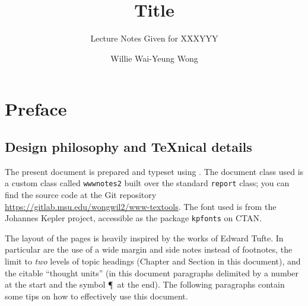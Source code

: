 \documentclass[noocg]{wwwnotes2}
\title{Title}
\subtitle{Lecture Notes Given for XXXYYY}
\author{Willie Wai-Yeung Wong}
\begin{document}
\maketitle


\chapter*{Preface}

\section{Design philosophy and \TeX{}nical details}

The present document is prepared and typeset using \LaTeXe. The document class used is a custom class called \texttt{wwwnotes2} built over the standard \texttt{report} class; you can find the source code at the Git repository \url{https://gitlab.msu.edu/wongwil2/www-textools}. The font used is from the Johannes Kepler project, accessible as the package \texttt{kpfonts} on CTAN.    
 
The layout of the pages is heavily inspired by the works of Edward Tufte. In particular are the use of a wide margin and side notes instead of footnotes, the limit to \emph{two} levels of topic headings (Chapter and Section in this document), and the citable ``thought units'' (in this document paragraphs delimited by a number at the start and the symbol \P\ at the end). The following paragraphs contain some tips on how to effectively use this document. 
  
\end{document}

